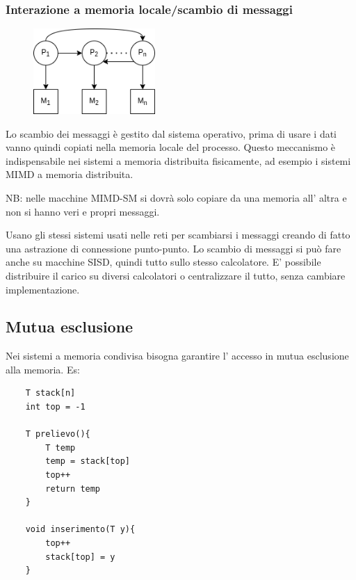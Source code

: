 \subsubsection{Interazione a memoria locale/scambio di messaggi}
\begin{figure}[H]
    \centering
    \includegraphics[width=175px]{images/6_Sincronizzazione_tra_processi/scambio_di_messaggi.png}
\end{figure}
Lo scambio dei messaggi è gestito dal sistema operativo, prima di usare i dati vanno quindi copiati nella memoria locale del processo.
Questo meccanismo è indispensabile nei sistemi a memoria distribuita fisicamente, ad esempio i sistemi MIMD a memoria distribuita.

NB: nelle macchine MIMD-SM si dovrà solo copiare da una memoria all' altra e non si hanno veri e propri messaggi.

Usano gli stessi sistemi usati nelle reti per scambiarsi i messaggi creando di fatto una astrazione di connessione punto-punto.
Lo scambio di messaggi si può fare anche su macchine SISD, quindi tutto sullo stesso calcolatore. E' possibile distribuire il carico su diversi calcolatori o centralizzare il tutto, senza cambiare implementazione.

\subsection{Mutua esclusione}
Nei sistemi a memoria condivisa bisogna garantire l' accesso in mutua esclusione alla memoria.
Es:
\begin{verbatim}
    T stack[n]
    int top = -1
    
    T prelievo(){
        T temp
        temp = stack[top]
        top++
        return temp
    }
    
    void inserimento(T y){
        top++
        stack[top] = y
    }
\end{verbatim}

